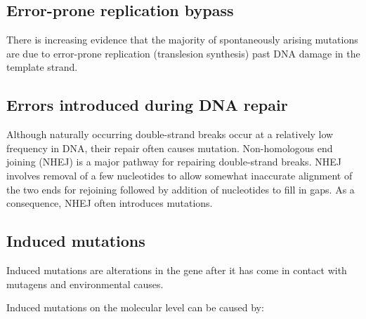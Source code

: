 \hypertarget{error-prone-replication-bypass}{%
\subsection{Error-prone replication bypass}\label{error-prone-replication-bypass}}

There is increasing evidence that the majority of spontaneously arising mutations are due to error-prone replication (translesion synthesis) past DNA damage in the template strand.

\hypertarget{errors-introduced-during-dna-repair}{%
\subsection{Errors introduced during DNA repair}\label{errors-introduced-during-dna-repair}}

Although naturally occurring double-strand breaks occur at a relatively low frequency in DNA, their repair often causes mutation. Non-homologous end joining (NHEJ) is a major pathway for repairing double-strand breaks. NHEJ involves removal of a few nucleotides to allow somewhat inaccurate alignment of the two ends for rejoining followed by addition of nucleotides to fill in gaps. As a consequence, NHEJ often introduces mutations.

\hypertarget{induced-mutations}{%
\subsection{Induced mutations}\label{induced-mutations}}

Induced mutations are alterations in the gene after it has come in contact with mutagens and environmental causes.

Induced mutations on the molecular level can be caused by:

